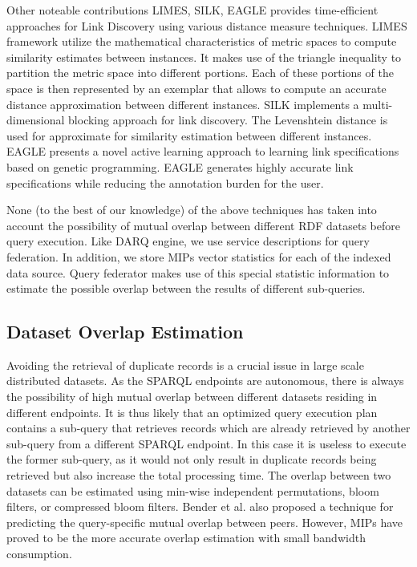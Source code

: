 \documentclass{sig-alternate}  %
\begin{document}
Other noteable contributions LIMES\cite{key-26}, SILK\cite{key-27}, EAGLE\cite{key-28} provides time-efficient approaches for Link Discovery using
various distance measure techniques. LIMES framework utilize the mathematical
characteristics of metric spaces to compute similarity estimates between
instances. It makes use of the triangle inequality to partition the
metric space into different portions. Each of these portions of the
space is then represented by an exemplar\cite{key-33} that allows to compute
an accurate distance approximation between different instances. SILK
implements a multi-dimensional blocking approach for link discovery.
The Levenshtein distance\cite{key-34} is used for approximate for similarity
estimation between different instances. EAGLE presents a novel active
learning approach to learning link specifications based on genetic programming.
EAGLE generates highly accurate link specifications while reducing the
annotation burden for the user. 

None (to the best of our knowledge) of the above techniques has taken into account the possibility of mutual overlap between different RDF datasets before query execution. Like DARQ engine, we use service
descriptions for query federation. In addition, we store MIPs vector
statistics for each of the indexed data source. Query federator makes
use of this special statistic information to estimate the possible
overlap between the results of different sub-queries.

\subsection{Dataset Overlap Estimation}
Avoiding the retrieval of duplicate records is a crucial issue in large scale distributed datasets. As the SPARQL endpoints are autonomous, there is always the possibility of high mutual overlap between different datasets residing in different endpoints. It is thus likely that an optimized query execution plan contains a sub-query that retrieves records which are already retrieved by another sub-query from a different SPARQL endpoint. In this case it is useless to execute the former sub-query, as it would not only result in duplicate records being retrieved but also increase the total processing time. The overlap between two datasets can be estimated using min-wise independent
permutations\cite{key-9}, bloom filters\cite{key-10}, or compressed bloom
filters\cite{key-11}. Bender et al.\cite{key-12} also proposed a technique
for predicting the query-specific mutual overlap between peers. However,
MIPs have proved to be the more accurate overlap estimation with small
bandwidth consumption\cite{key-9}.
\end{document}
